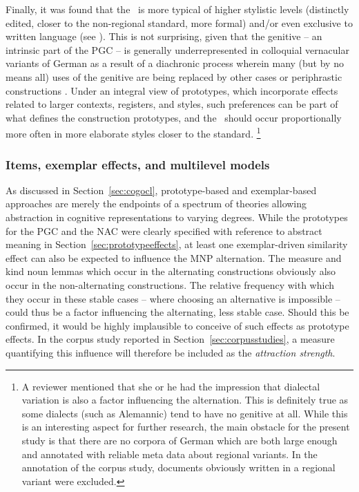 Finally, it was found that the \PGCa\ is more typical of higher stylistic levels (distinctly edited, closer to the non-regional standard, more formal) and\slash or even exclusive to written language (see \citealp[320--323]{Hentschel1993}).
This is not surprising, given that the genitive -- an intrinsic part of the PGC -- is generally underrepresented in colloquial vernacular variants of German as a result of a diachronic process wherein many (but by no means all) uses of the genitive are being replaced by other cases or periphrastic constructions \citep{FleischerSchallert2011}.
Under an integral view of prototypes, which incorporate effects related to larger contexts, registers, and styles, such preferences can be part of what defines the construction prototypes, and the \PGCa\ should occur proportionally more often in more elaborate styles closer to the standard.%
\footnote{A reviewer mentioned that she or he had the impression that dialectal variation is also a factor influencing the alternation.
This is definitely true as some dialects (such as Alemannic) tend to have no genitive at all.
While this is an interesting aspect for further research, the main obstacle for the present study is that there are no corpora of German which are both large enough and annotated with reliable meta data about regional variants.
In the annotation of the corpus study, documents obviously written in a regional variant were excluded.}

\subsubsection{Items, exemplar effects, and multilevel models}
\label{sec:itemandexemplareffects}

As discussed in Section~\ref{sec:cogocl}, prototype-based and exemplar-based approaches are merely the endpoints of a spectrum of theories allowing abstraction in cognitive representations to varying degrees.
While the prototypes for the PGC and the NAC were clearly specified with reference to abstract meaning in Section~\ref{sec:prototypeeffects}, at least one exemplar-driven similarity effect can also be expected to influence the MNP alternation.
The measure and kind noun lemmas which occur in the alternating constructions obviously also occur in the non-alternating constructions.
The relative frequency with which they occur in these stable cases -- where choosing an alternative is impossible -- could thus be a factor influencing the alternating, less stable case.
Should this be confirmed, it would be highly implausible to conceive of such effects as prototype effects.
In the corpus study reported in Section~\ref{sec:corpusstudies}, a measure quantifying this influence will therefore be included as the \textit{attraction strength}.

